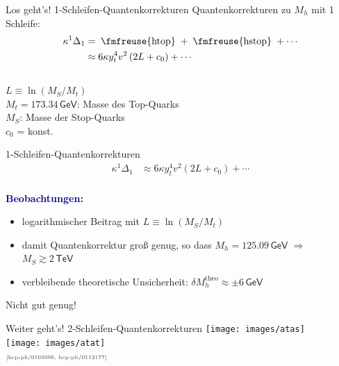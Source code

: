 \documentclass[hyperref={pdfpagelabels=false},ngerman]{beamer}
\newcommand{\fmfvcenter}[1]{\;\vcenter{\hbox{\fmfreuse{#1}}}\;}
\newcommand{\eh}[1]{\,\mathsf{#1}}
\newcommand{\MS}{\ensuremath{M_S}}
\newcommand{\mycite}[1]{\ensuremath{\text{\textcolor{darkgray}{\tiny [#1]}}}}
\renewcommand{\emph}[1]{\textbf{\textcolor{darkblue}{#1}}}
\newcommand{\GeV}{\eh{GeV}}
\newcommand{\TeV}{\eh{TeV}}
\begin{document}
\begin{frame}{Los geht's! 1-Schleifen-Quantenkorrekturen}
  Quantenkorrekturen zu $M_h$ mit 1 Schleife:
  \begin{align*}
    \kappa^1\Delta_1
    &= \fmfvcenter{htop} + \fmfvcenter{hstop} + \cdots \\
    &\approx 6 \kappa y_t^4 v^2 \left(
      2L + c_0
    \right) + \cdots
  \end{align*}
  \\[1em]
  $L\equiv\ln(\MS / M_t)$ \\[0.5em]
  $M_t = 173.34\GeV$: Masse des Top-Quarks \\[0.5em]
  $\MS$: Masse der Stop-Quarks \\[0.5em]
  $c_0$ = konst.
\end{frame}

\begin{frame}{1-Schleifen-Quantenkorrekturen}
  \begin{align*}
    \kappa^1\Delta_1 &\approx
    6 \kappa y_t^4 v^2 \left(
      2L + c_0
    \right) + \cdots
  \end{align*}
  \\[1em]
  \emph{Beobachtungen:}
  \begin{itemize}
  \item logarithmischer Beitrag mit $L\equiv\ln(\MS / M_t)$
  \item damit Quantenkorrektur groß genug, so dass $M_h = 125.09\GeV$
    $\Rightarrow$ $\MS \gtrsim 2\TeV$
  \item verbleibende theoretische Unsicherheit: $\delta M_h^{\text{theo}} \approx \pm 6 \GeV$
  \end{itemize}
  \vspace*{1em}
  Nicht gut genug!
\end{frame}

\begin{frame}{Weiter geht's! 2-Schleifen-Quantenkorrekturen}
  \texttt{[image: images/atas]}\\[1em]
  \texttt{[image: images/atat]}
  \\
  \vspace*{1em}
  \mycite{hep-ph/0105096, hep-ph/0112177}
\end{frame}
\end{document}
